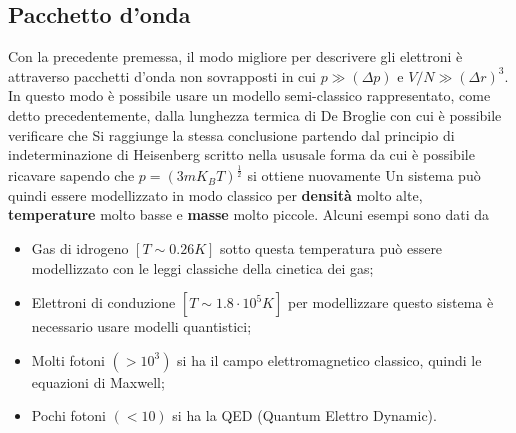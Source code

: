 \subsection{Pacchetto d'onda}
Con la precedente premessa, il modo migliore per descrivere gli elettroni è attraverso  pacchetti d'onda non sovrapposti in cui $p\gg (\Delta p)$ e  $V/N \gg (\Delta r)^3$. In questo modo  è possibile usare un modello semi-classico rappresentato, come detto precedentemente, dalla lunghezza termica di De Broglie
con cui è possibile verificare che 
Si raggiunge la stessa conclusione partendo dal principio di indeterminazione di Heisenberg scritto nella ususale forma
da cui è possibile ricavare
sapendo che $p=(3mK_BT)^{\frac{1}{2}}$ si ottiene nuovamente
Un sistema può quindi essere modellizzato in modo classico per \textbf{densità} molto alte, \textbf{temperature} molto basse e \textbf{masse} molto piccole. Alcuni esempi sono dati da
\begin{itemize}
	\item Gas di idrogeno $[T\sim 0.26 K]$ sotto questa temperatura può essere modellizzato con le leggi classiche della cinetica dei gas;
	\item Elettroni di conduzione $[T \sim 1.8\cdot 10^5K]$ per modellizzare questo sistema è necessario usare modelli quantistici;
	\item Molti fotoni $(>10^3)$ si ha il campo elettromagnetico classico, quindi le equazioni di Maxwell;
	\item Pochi fotoni $(<10)$ si ha la QED (Quantum Elettro Dynamic).
\end{itemize}
